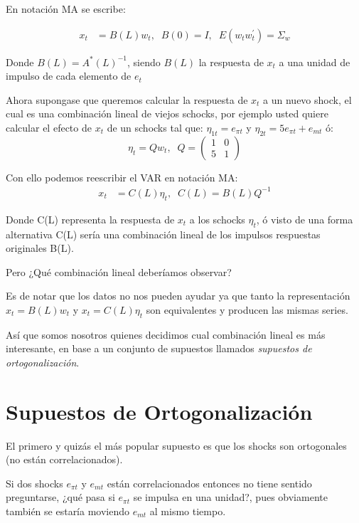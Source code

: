 \documentclass[
]{book}
\begin{document}
En notación MA se escribe:

\begin{align}
x_{t}&=B(L)w_{t},\;\;B(0)=I,\;\;E(w_{t}w_{t}^{'})=\Sigma_w 
\end{align}

Donde \(B(L)=A^{*}(L)^{-1}\), siendo \(B(L)\) la respuesta de \(x_{t}\) a una unidad de impulso de cada elemento de \(e_{t}\)

Ahora supongase que queremos calcular la respuesta de \(x_{t}\) a un nuevo shock, el cual es una combinación lineal de viejos schocks, por ejemplo usted quiere calcular el efecto de \(x_{t}\) de un schocks tal que: \(\eta_{1t}=e_{\pi t}\) y \(\eta_{2t}=5e_{\pi t}+e_{mt}\) ó:
\begin{equation}
\eta_{t}=Qw_t,\;\;Q=\left( \begin{array}{cc}
    1 & 0\\
    5 & 1
\end{array}
\right) \nonumber
\end{equation}

Con ello podemos reescribir el VAR en notación MA:
\begin{align}
x_{t}&=C(L)\eta_{t},\;\;C(L)=B(L)Q^{-1}
\end{align}

Donde C(L) representa la respuesta de \(x_{t}\) a los schocks \(\eta_{t}\), ó visto de una forma alternativa C(L) sería una combinación lineal de los impulsos respuestas originales B(L).

Pero ¿Qué combinación lineal deberíamos observar?

Es de notar que los datos no nos pueden ayudar ya que tanto la representación \(x_{t}=B(L)w_{t}\) y \(x_{t}=C(L)\eta_{t}\) son equivalentes y producen las mismas series.

Así que somos nosotros quienes decidimos cual combinación lineal es más interesante, en base a un conjunto de supuestos llamados \emph{supuestos de ortogonalización}.

\hypertarget{supuestos-de-ortogonalizaciuxf3n}{%
\section{Supuestos de Ortogonalización}\label{supuestos-de-ortogonalizaciuxf3n}}

El primero y quizás el más popular supuesto es que los shocks son ortogonales (no están correlacionados).

Si dos shocks \(e_{\pi t}\) y \(e_{mt}\) están correlacionados entonces no tiene sentido preguntarse, ¿qué pasa si \(e_{\pi t}\) se impulsa en una unidad?, pues obviamente también se estaría moviendo \(e_{mt}\) al mismo tiempo.
\end{document}
